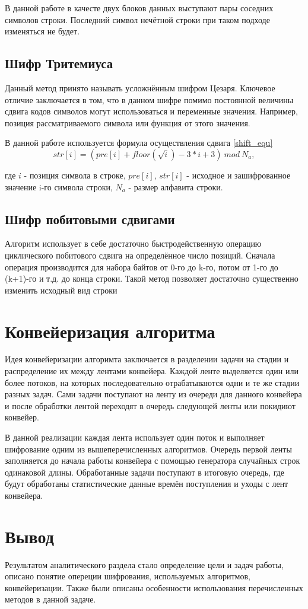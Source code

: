 	В данной работе в качесте двух блоков данных выступают пары соседних символов строки. Последний символ нечётной строки при таком подходе изменяться не будет.

\subsection{Шифр Тритемиуса}
	Данный метод принято называть усложнённым шифром Цезаря. Ключевое отличие заключается в том, что в данном шифре помимо постоянной величины сдвига кодов символов могут использоваться и переменные значения. Например, позиция рассматриваемого символа или функция от этого значения.
	
	В данной работе используется формула осуществления сдвига \ref{shift_equ}
	\begin{equation}\label{shift_equ}
		str[i] = (pre[i] + floor(\sqrt{i}) - 3*i + 3)\:mod\:N_a,
	\end{equation}
	
	где 
	$i$ - позиция символа в строке, 
	$pre[i]$, $str[i]$ - исходное и зашифрованное значение i-го символа строки, 
	$N_a$ - размер алфавита строки.

\subsection{Шифр побитовыми сдвигами}
	Алгоритм использует в себе достаточно быстродейственную операцию циклического побитового сдвига на определённое число позиций. Сначала операция производится для набора байтов от 0-го до k-го, потом от 1-го до (k+1)-го и т.д. до конца строки. Такой метод позволяет достаточно существенно изменить исходный вид строки

\section{Конвейеризация алгоритма}
Идея конвейеризации алгоримта заключается в разделении задачи на стадии и распределение их между лентами конвейера. Каждой ленте выделяется один или более потоков, на которых последовательно отрабатываются одни и те же стадии разных задач. Сами задачи поступают на ленту из очереди для данного конвейера и после обработки лентой переходят в очередь следующей ленты или покидиют конвейер.

В данной реализации каждая лента использует один поток и выполняет шифрование одним из вышеперечисленных алгоритмов. Очередь первой ленты заполняется до начала работы конвейера с помощью генератора случайных строк одинаковой длины. Обработанные задачи поступают в итоговую очередь, где будут обработаны статистические данные времён поступления и уходы с лент конвейера.

\section*{Вывод}
Результатом аналитического раздела стало определение цели и задач работы, описано понятие опереции шифрования, используемых алгоритмов, конвейеризации. Также были описаны особенности использования перечисленных методов в данной задаче.